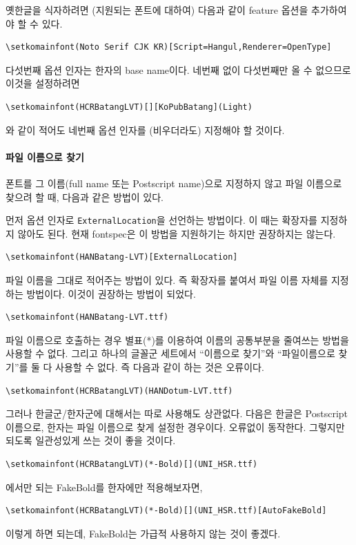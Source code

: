 \documentclass[
	12pt,
	a4paper,
	kosection,
	footnote,
	microtype,
	figtabcapt,
]{oblivoir}
\begin{document}
옛한글을 식자하려면 (지원되는 폰트에 대하여) 다음과 같이 feature 옵션을 추가하여야 할 수 있다.
\begin{verbatim}
\setkomainfont(Noto Serif CJK KR)[Script=Hangul,Renderer=OpenType]
\end{verbatim}

다섯번째 옵션 인자는 한자의 base name이다. 네번째 없이 다섯번째만 올 수 없으므로 이것을
설정하려면
\begin{verbatim}
\setkomainfont(HCRBatangLVT)[][KoPubBatang](Light)
\end{verbatim}
와 같이 적어도 네번째 옵션 인자를 (비우더라도) 지정해야 할 것이다.

\paragraph{파일 이름으로 찾기}
폰트를 그 이름(full name 또는 Postscript name)으로 지정하지 않고 파일 이름으로 찾으려 할 때,
다음과 같은 방법이 있다.

먼저 옵션 인자로 \texttt{ExternalLocation}을 선언하는 방법이다. 이 때는 확장자를 지정하지 않아도 된다. 현재 \textsf{fontspec}은 이 방법을 지원하기는 하지만 권장하지는 않는다.
\begin{verbatim}
\setkomainfont(HANBatang-LVT)[ExternalLocation]
\end{verbatim}
파일 이름을 그대로 적어주는 방법이 있다. 즉 확장자를 붙여서 파일 이름 자체를 지정하는 방법이다. 이것이 권장하는 방법이 되었다.
\begin{verbatim}
\setkomainfont(HANBatang-LVT.ttf)
\end{verbatim}

파일 이름으로 호출하는 경우 별표(*)를 이용하여 이름의 공통부분을 줄여쓰는 방법을 사용할 수 없다.
그리고 
하나의 글꼴군 세트에서 ``이름으로 찾기''와 ``파일이름으로 찾기''를 둘 다 사용할 수 없다. 즉 다음과 같이 하는 것은 오류이다.
\begin{verbatim}
\setkomainfont(HCRBatangLVT)(HANDotum-LVT.ttf)
\end{verbatim}
그러나 한글군/한자군에 대해서는 따로 사용해도 상관없다. 다음은 한글은 Postscript 이름으로,
한자는 파일 이름으로 찾게 설정한 경우이다. 오류없이 동작한다. 그렇지만 되도록 일관성있게 쓰는 것이 좋을 것이다.
\begin{verbatim}
\setkomainfont(HCRBatangLVT)(*-Bold)[](UNI_HSR.ttf)
\end{verbatim}
\XeTeX 에서만 되는 FakeBold를 한자에만 적용해보자면,
\begin{verbatim}
\setkomainfont(HCRBatangLVT)(*-Bold)[](UNI_HSR.ttf)[AutoFakeBold]
\end{verbatim}
이렇게 하면 되는데, FakeBold는 가급적 사용하지 않는 것이 좋겠다.
\end{document}
